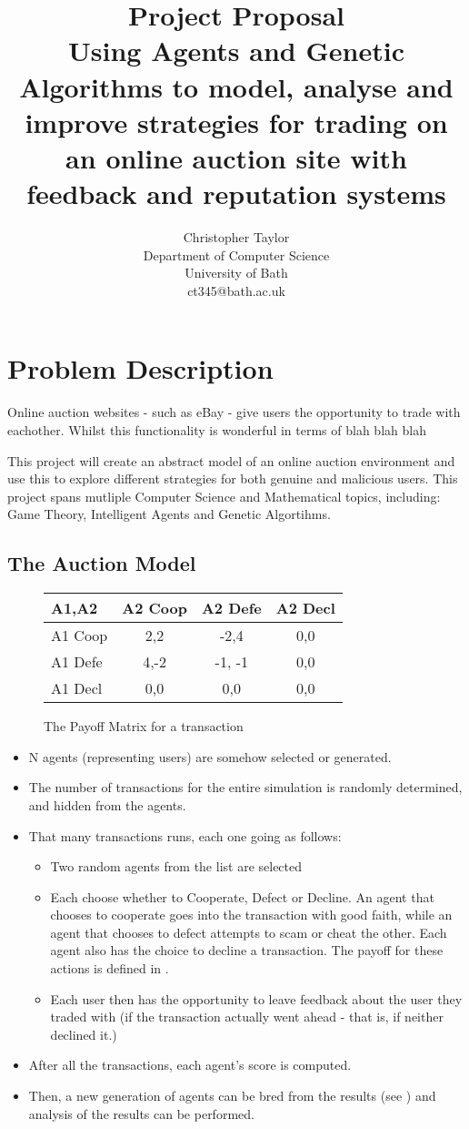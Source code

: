 \documentclass{article}
\title{Project Proposal \\ Using Agents and Genetic Algorithms to model, analyse and improve strategies for trading on an online auction site with feedback and reputation systems}
\author{Christopher Taylor \\ Department of Computer Science \\ University of Bath \\ ct345@bath.ac.uk}
\begin{document}
\maketitle
\section{Problem Description}
\label{sec:problem-description}
Online auction websites - such as eBay - give users the opportunity to trade with eachother. Whilst this functionality is wonderful in terms of blah blah blah

This project will create an abstract model of an online auction environment and use this to explore different strategies for both genuine and malicious users. This project spans mutliple Computer Science and Mathematical topics, including: Game Theory, Intelligent Agents and Genetic Algortihms.
\subsection{The Auction Model}
	\begin{figure}
		\label{fig:model-payoff}
		\caption{The Payoff Matrix for a transaction}
		\begin{tabular}{| l || c | c | c |}
			\hline
			A1,A2 & A2 Coop & A2 Defe & A2 Decl \\ \hline
			A1 Coop & 2,2 & -2,4 & 0,0 \\ \hline  
			A1 Defe & 4,-2 & -1, -1 & 0,0 \\ \hline
			A1 Decl & 0,0 & 0,0 & 0,0 \\ \hline
		\end{tabular}
	\end{figure}
\begin{itemize}
	\item N agents (representing users) are somehow selected or generated.
	\item The number of transactions for the entire simulation is randomly determined, and hidden from the agents.
	\item That many transactions runs, each one going as follows:
	\begin{itemize}
		\item Two random agents from the list are selected
		\item Each choose whether to Cooperate, Defect or Decline. An agent that chooses to cooperate goes into the transaction with good faith, while an agent that chooses to defect attempts to scam or cheat the other. Each agent also has the choice to decline a transaction. The payoff for these actions is defined in .
		\item Each user then has the opportunity to leave feedback about the user they traded with (if the transaction actually went ahead - that is, if neither declined it.)
	\end{itemize}
	\item After all the transactions, each agent's score is computed.
	\item Then, a new generation of agents can be bred from the results (see ) and analysis of the results can be performed.
\end{itemize}
\end{document}
